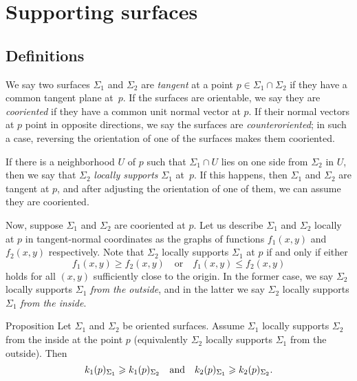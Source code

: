 \chapter{Supporting surfaces}
\label{chap:surface-support}

\section{Definitions}


We say two surfaces $\Sigma_1$ and $\Sigma_2$ are \emph{tangent} at a point $p \in \Sigma_1 \cap \Sigma_2$ if they have a common tangent plane at~$p$. If the surfaces are orientable, we say they are \emph{cooriented} if they have a common unit normal vector at $p$. If their normal vectors at $p$ point in opposite directions, we say the surfaces are \emph{counteroriented}; in such a case, reversing the orientation of one of the surfaces makes them cooriented.

If there is a neighborhood $U$ of $p$ such that $\Sigma_1\cap U$ lies on one side from $\Sigma_2$ in $U$, then we say that $\Sigma_2$ \emph{locally supports} $\Sigma_1$ at~$p$. If this happens, then $\Sigma_1$ and $\Sigma_2$ are tangent at $p$, and after adjusting the orientation of one of them, we can assume they are cooriented.

Now, suppose $\Sigma_1$ and $\Sigma_2$ are cooriented at $p$.
Let us describe $\Sigma_1$ and $\Sigma_2$ locally at $p$ in tangent-normal coordinates as the graphs of functions $f_1(x,y)$ and $f_2(x,y)$ respectively. Note that $\Sigma_2$ locally supports $\Sigma_1$ at $p$ if and only if either
\[   f_1(x,y)\ge f_2(x,y)
\quad\text{or}\quad
f_1(x,y)\le f_2(x,y)\]
holds for all $(x,y)$ sufficiently close to the origin. In the former case, we say  $\Sigma_2$ locally supports $\Sigma_1$ \emph{from the outside}, and in the latter we say $\Sigma_2$ locally supports $\Sigma_1$ \emph{from the inside}. 



\begin{thm}{Proposition}\label{prop:surf-support}
Let $\Sigma_1$ and $\Sigma_2$ be oriented surfaces.
Assume $\Sigma_1$ locally supports $\Sigma_2$ from the inside at the point $p$ (equivalently $\Sigma_2$ locally supports $\Sigma_1$ from the outside).
Then 
\[k_1(p)_{\Sigma_1}\ge k_1(p)_{\Sigma_2}\quad\text{and}\quad k_2(p)_{\Sigma_1}\z\ge k_2(p)_{\Sigma_2}.\]
\end{thm}

